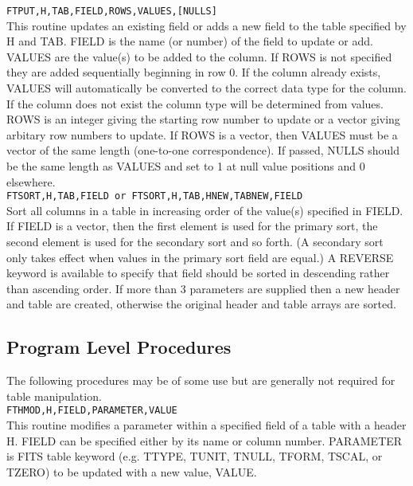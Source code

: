 \documentclass[twoside,12pt]{article}
\begin{document}
{\tt  FTPUT,H,TAB,FIELD,ROWS,VALUES,[NULLS]} \\
 
	This routine updates an existing field or adds a new
	field to the table specified by H and TAB.  FIELD
	is the name (or number) of the field to update or add.   
        VALUES are the value(s) to be added to the column.  If 
        ROWS is not specified they are added sequentially 
        beginning in row 0.  If the column already exists, VALUES 
        will automatically be converted to the correct data type 
        for the column.  If the column does not exist the column 
        type will be determined from values.  ROWS is an integer 
        giving the starting row number to update or a vector giving
	arbitary row numbers to update.  If ROWS is a vector, then
	VALUES must be a vector of the same length (one-to-one
	correspondence). If passed, NULLS should be the
        same length as VALUES and set to 1 at null value positions
        and 0 elsewhere. \\
 
{\tt FTSORT,H,TAB,FIELD or FTSORT,H,TAB,HNEW,TABNEW,FIELD} \\

        Sort all columns in a table in increasing order of the value(s)
        specified in FIELD.  If FIELD is a vector, then the first element is 
        used for the primary sort, the second element is used for the secondary
       sort and so forth.   (A secondary sort only takes effect when values in
        the primary sort field are equal.)    A REVERSE keyword is available to
       specify that field should be sorted in descending rather than ascending
        order.  If more than 3 parameters are supplied
        then a new header and table are created, otherwise the original
        header and table arrays are sorted. \\

\subsection{Program Level Procedures}

    The following procedures may be of some use but are generally
    not required for table manipulation. \\
 
{\tt FTHMOD,H,FIELD,PARAMETER,VALUE} \\

        This routine modifies a parameter within a specified field
        of a table with a header H.  FIELD can be specified either
        by its name or column number.  PARAMETER is FITS table keyword
        (e.g. TTYPE, TUNIT, TNULL, TFORM, TSCAL, or TZERO) to be
        updated with a new value, VALUE.  \\
\end{document}
